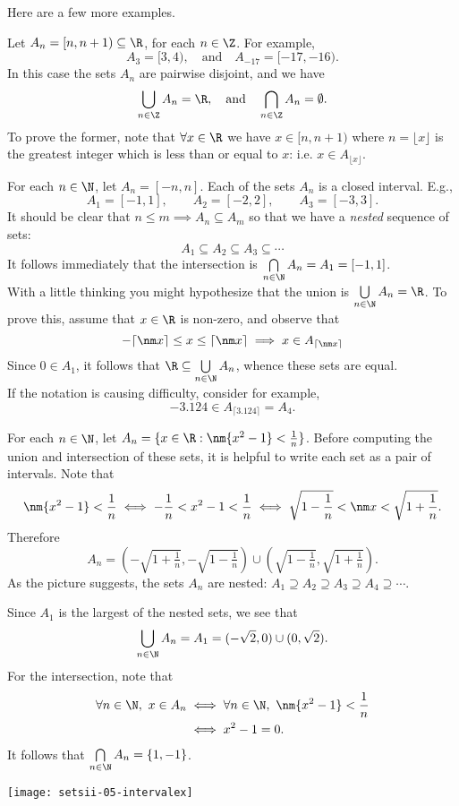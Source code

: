 Here are a few more examples.

 
\begin{examples}
	\item\label{ex:index2} Let $A_n=[n,n+1)\subseteq\R$, for each $n\in\Z$. For example,
\[A_3=[3,4),\quad\text{and}\quad A_{-17}=[-17,-16).\]
In this case the sets $A_n$ are pairwise disjoint, and we have
\[\bigcup\limits_{n\in\Z}A_n=\R,\quad\text{and}\quad\bigcap\limits_{n\in\Z}A_n=\emptyset.\]
To prove the former, note that $\forall x\in\R$ we have $x\in[n,n+1)$ where $n=\lfloor x\rfloor$ is the greatest integer which is less than or equal to $x$: i.e. $x\in A_{\lfloor x\rfloor}$.


	\item\vspace*{5pt} For each $n\in\N$, let $A_n=[-n,n]$. Each of the sets $A_n$ is a closed interval. E.g.,
	\[A_1=[-1,1],\qquad A_2=[-2,2],\qquad A_3=[-3,3].\]
	It should be clear that $n\le m\implies A_n\subseteq A_m$ so that we have a \emph{nested} sequence of sets:
	\[A_1\subseteq A_2\subseteq A_3\subseteq\cdots\]
	It follows immediately that the intersection is $\bigcap\limits_{n\in\N}A_n=A_1=[-1,1]$.\\
	With a little thinking you might hypothesize that the union is $\bigcup\limits_{n\in\N}A_n=\R$. To prove this, assume that $x\in\R$ is non-zero, and observe that
	\[-\lceil\nm x\rceil\le x\le\lceil\nm x\rceil\implies x\in A_{\lceil\nm x\rceil}\]
	Since $0\in A_1$, it follows that $\R\subseteq\bigcup\limits_{n\in\N}A_n$, whence these sets are equal.\\
	If the notation is causing difficulty, consider for example,
	\[-3.124\in A_{\lceil 3.124\rceil}=A_4.\]
	
	\item For each $n\in\N$, let $A_n=\{x\in\R:\nm{x^2-1}<\frac 1n\}$. Before computing the union and intersection of these sets, it is helpful to write each set as a pair of intervals. Note that
	\[\nm{x^2-1}<\frac 1n\iff -\frac 1n< x^2-1<\frac 1n\iff \sqrt{1-\frac 1n}< \nm x< \sqrt{1+\frac 1n}.\]
	Therefore
	\[A_n=\left(-\sqrt{1+\tfrac 1n},-\sqrt{1-\tfrac 1n}\right)\cup\left(\sqrt{1-\tfrac 1n},\sqrt{1+\tfrac 1n}\right).\]
	As the picture suggests, the sets $A_n$ are nested: $A_1\supseteq A_2\supseteq A_3\supseteq A_4\supseteq\cdots$.\\[5pt]
	\noindent\begin{minipage}{0.5\textwidth}
	Since $A_1$ is the largest of the nested sets, we see that
	\[\bigcup\limits_{n\in\N}A_n=A_1=(-\sqrt{2},0)\cup(0,\sqrt{2}).\]
	For the intersection, note that
	\begin{align*}
	\forall n\in\N,\ x\in A_n&\iff \forall n\in\N,\ \nm{x^2-1}<\frac 1n\\
	&\iff x^2-1=0.
	\end{align*}
	It follows that $\bigcap\limits_{n\in\N}A_n=\{1,-1\}$.
	\end{minipage}\hfill\begin{minipage}{0.38\textwidth}
	\texttt{[image: setsii-05-intervalex]}
	\end{minipage}
\end{examples}


